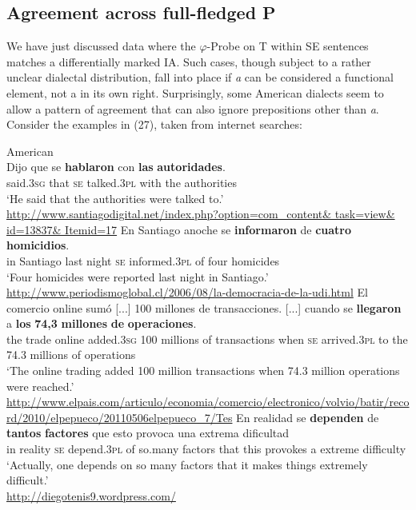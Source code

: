 \documentclass[output=paper]{langsci/langscibook}
\begin{document}
\subsection{Agreement across full-fledged P}%

We have just discussed data where the $\varphi $-Probe on T within SE sentences matches a differentially marked IA. Such cases, though subject to a rather unclear dialectal distribution, fall into place if  \textit{a} can be considered a functional element, not a  in its own right. Surprisingly, some American  dialects seem to allow a pattern of agreement that can also ignore prepositions other than \textit{a}. Consider the examples in (27), taken from internet searches:\largerpage[2]

\ea%
    American \label{ex:gallego:27}\\
    \ea
    \gll Dijo que se  \textbf{hablaron}    con   \textbf{las}   \textbf{autoridades}.\\
         said.\textsc{3sg}  that \textsc{se}   talked.\textsc{3pl}  with  the  authorities\\
    \glt ‘He said that the authorities were talked to.’\\
    {\small\url{http://www.santiagodigital.net/index.php?option=com\_content\& task=view\& id=13837\& Itemid=17}}
    \ex
    \gll En Santiago anoche    se  \textbf{informaron}   de \textbf{cuatro}  \textbf{homicidios}.\\
         in  Santiago {last night} \textsc{se}   informed.\textsc{3pl} of  four     homicides\\
    \glt ‘Four homicides were reported last night in Santiago.’\\
    {\small\url{http://www.periodismoglobal.cl/2006/08/la-democracia-de-la-udi.html}}
    \ex
    \gll El  comercio online sumó [...]   100 millones de transacciones.          [...] cuando se   \textbf{llegaron}       a   \textbf{los} \textbf{74,3} \textbf{millones}  \textbf{de} \textbf{operaciones}.\\
         the trade       online added{}.\textsc{3sg} {} 100 millions  of transactions {}               when    \textsc{se}   arrived{}.\textsc{3pl}  to the 74.3 millions    of operations\\
    \glt ‘The online trading added 100 million transactions when 74.3 million operations were reached.’\\
    {\small\url{http://www.elpais.com/articulo/economia/comercio/electronico/volvio/batir/record/2010/elpepueco/20110506elpepueco\_7/Tes}}
    \ex
    \gll En realidad se  \textbf{dependen} de  \textbf{tantos} \textbf{factores}  que  esto provoca  una extrema  dificultad\\
         in   reality   \textsc{se}   depend{}.\textsc{3pl} of   so.many    factors  that this provokes a    extreme  difficulty\\
    \glt ‘Actually, one depends on so many factors that it makes things extremely difficult.’\\
         {\small\url{http://diegotenis9.wordpress.com/}}
    \z
\z    
\end{document}
